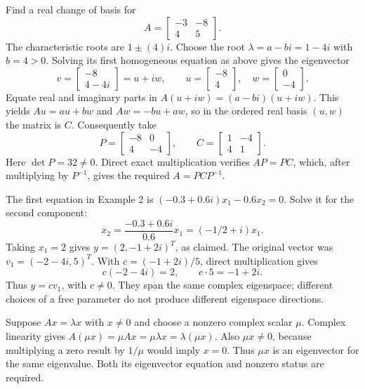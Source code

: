 \goal Find a real change of basis for
\[A=\begin{bmatrix}-3&-8\\4&5\end{bmatrix}.\]
The characteristic roots are $1\pm(4)i$. Choose the root $\lambda=a-bi=1 - 4 i$ with $b=4>0$. Solving its first homogeneous equation as above gives the eigenvector
\[v=\begin{bmatrix}-8\\4 - 4 i\end{bmatrix}=u+iw,\qquad u=\begin{bmatrix}-8\\4\end{bmatrix},\quad w=\begin{bmatrix}0\\-4\end{bmatrix}.\]
Equate real and imaginary parts in $A(u+iw)=(a-bi)(u+iw)$. This yields $Au=au+bw$ and $Aw=-bu+aw$, so in the ordered real basis $(u,w)$ the matrix is $C$. Consequently take
\[P=\begin{bmatrix}-8&0\\4&-4\end{bmatrix},\qquad C=\begin{bmatrix}1&-4\\4&1\end{bmatrix}.\]
Here $\det P=32\ne0$. Direct exact multiplication verifies $AP=PC$, which, after multiplying by $P^{-1}$, gives the required $A=PCP^{-1}$.


The first equation in Example 2 is $(-0.3+0.6i)x_1-0.6x_2=0$. Solve it for the second component:
\[
x_2=\frac{-0.3+0.6i}{0.6}x_1=(-1/2+i)x_1.
\]
Taking $x_1=2$ gives $y=(2,-1+2i)^T$, as claimed. The original vector was $v_1=(-2-4i,5)^T$. With $c=(-1+2i)/5$, direct multiplication gives
\[
c(-2-4i)=2,\qquad c\cdot5=-1+2i.
\]
Thus $y=cv_1$, with $c\ne0$. They span the same complex eigenspace; different choices of a free parameter do not produce different eigenspace directions.

Suppose $Ax=\lambda x$ with $x\ne0$ and choose a nonzero complex scalar $\mu$. Complex linearity gives $A(\mu x)=\mu Ax=\mu\lambda x=\lambda(\mu x)$. Also $\mu x\ne0$, because multiplying a zero result by $1/\mu$ would imply $x=0$. Thus $\mu x$ is an eigenvector for the same eigenvalue. Both its eigenvector equation and nonzero status are required.

